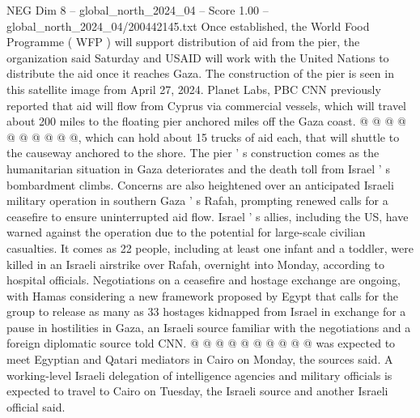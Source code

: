 \begin{textsample}{NEG Dim 8 – global\_north\_2024\_04 – Score 1.00 – global\_north\_2024\_04/200442145.txt}
Once established, the World Food Programme ( WFP ) will support distribution of aid from the pier, the organization said Saturday and USAID will work with the United Nations to distribute the aid once it reaches Gaza.
The construction of the pier is seen in this satellite image from April 27, 2024.
Planet Labs, PBC CNN previously reported that aid will flow from Cyprus via commercial vessels, which will travel about 200 miles to the floating pier anchored miles off the Gaza coast. @ @ @ @ @ @ @ @ @ @, which can hold about 15 trucks of aid each, that will shuttle to the causeway anchored to the shore.
The pier ' s construction comes as the humanitarian situation in Gaza deteriorates and the death toll from Israel ' s bombardment climbs.
Concerns are also heightened over an anticipated Israeli military operation in southern Gaza ' s Rafah, prompting renewed calls for a ceasefire to ensure uninterrupted aid flow.
Israel ' s allies, including the US, have warned against the operation due to the potential for large-scale civilian casualties.
It comes as 22 people, including at least one infant and a toddler, were killed in an Israeli airstrike over Rafah, overnight into Monday, according to hospital officials.
Negotiations on a ceasefire and hostage exchange are ongoing, with Hamas considering a new framework proposed by Egypt that calls for the group to release as many as 33 hostages kidnapped from Israel in exchange for a pause in hostilities in Gaza, an Israeli source familiar with the negotiations and a foreign diplomatic source told CNN. @ @ @ @ @ @ @ @ @ @ was expected to meet Egyptian and Qatari mediators in Cairo on Monday, the sources said.
A working-level Israeli delegation of intelligence agencies and military officials is expected to travel to Cairo on Tuesday, the Israeli source and another Israeli official said.

\end{textsample}

